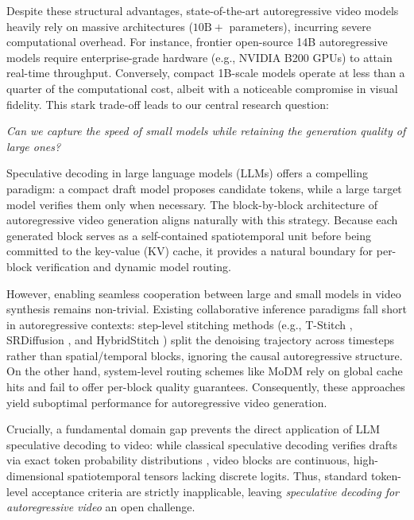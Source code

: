 \documentclass{article} %
\begin{document}
Despite these structural advantages, state-of-the-art autoregressive video models heavily rely on massive architectures ($10\text{B}+$ parameters), incurring severe computational overhead. For instance, frontier open-source 14B autoregressive models \citep{krea_realtime_14b} require enterprise-grade hardware (e.g., NVIDIA B200 GPUs) to attain real-time throughput. Conversely, compact 1B-scale models \citep{wan2025wanopenadvancedlargescale} operate at less than a quarter of the computational cost, albeit with a noticeable compromise in visual fidelity. This stark trade-off leads to our central research question:

\begin{center}
\emph{Can we capture the speed of small models while retaining the generation quality of large ones?}
\end{center}

Speculative decoding in large language models (LLMs) \citep{leviathan2023fastinferencetransformersspeculative,chen2023acceleratinglargelanguagemodel} offers a compelling paradigm: a compact draft model proposes candidate tokens, while a large target model verifies them only when necessary. The block-by-block architecture of autoregressive video generation aligns naturally with this strategy. Because each generated block serves as a self-contained spatiotemporal unit before being committed to the key-value (KV) cache, it provides a natural boundary for per-block verification and dynamic model routing.

However, enabling seamless cooperation between large and small models in video synthesis remains non-trivial. Existing collaborative inference paradigms fall short in autoregressive contexts: step-level stitching methods (e.g., T-Stitch \citep{pan2024tstitchacceleratingsamplingpretrained}, SRDiffusion \citep{cheng2025srdiffusionacceleratevideodiffusion}, and HybridStitch \citep{sun2026hybridstitch}) split the denoising trajectory across timesteps rather than spatial/temporal blocks, ignoring the causal autoregressive structure. On the other hand, system-level routing schemes like MoDM \citep{xia2025modmefficientservingimage} rely on global cache hits and fail to offer per-block quality guarantees. Consequently, these approaches yield suboptimal performance for autoregressive video generation.

Crucially, a fundamental domain gap prevents the direct application of LLM speculative decoding to video: while classical speculative decoding verifies drafts via exact token probability distributions \citep{leviathan2023fastinferencetransformersspeculative}, video blocks are continuous, high-dimensional spatiotemporal tensors lacking discrete logits. Thus, standard token-level acceptance criteria are strictly inapplicable, leaving \emph{speculative decoding for autoregressive video} an open challenge.
\end{document}
